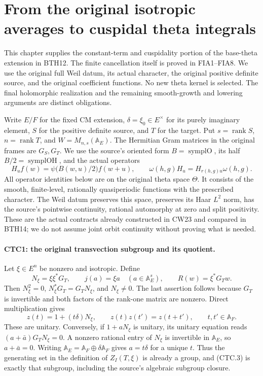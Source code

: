 \section{From the original isotropic averages to cuspidal theta integrals}
\label{sec:constant-terms-v33}

This chapter supplies the constant-term and cuspidality portion of
the base-theta extension in BTH12.  The finite cancellation itself is
proved in FIA1--FIA8.  We use the original full Weil datum, its actual
character, the original positive definite source, and the original
coefficient functions.  No new theta kernel is selected.  The final
holomorphic realization and the remaining smooth-growth and lowering
arguments are distinct obligations.

Write $E/F$ for the fixed CM extension, $\delta=\xi_0\in E^\times$
for its purely imaginary element, $S$ for the positive definite source,
and $T$ for the target.  Put $s=\operatorname{rank}S$,
$n=\operatorname{rank}T$, and
$W=M_{n,s}(\mathbb A_E)$.  The Hermitian Gram matrices in the original
frames are $G_S,G_T$.  We use the source's oriented form
$B=\operatorname{symplO}$, its half $B/2=\operatorname{symplOH}$,
and the actual operators
\[
 H_u f(w)=\psi\bigl(B(w,u)/2\bigr)f(w+u),\qquad
 \omega(h,g)H_u=H_{r(h,g)u}\omega(h,g).
 \tag{CTC.1}
\]
All operator identities below are on the original theta space
$\Theta$.  It consists of the smooth, finite-level, rationally
quasiperiodic functions with the prescribed character.  The Weil
datum preserves this space, preserves its Haar $L^2$ norm, has the
source's pointwise continuity, rational automorphy at zero and split
positivity.  These are the actual contracts already constructed in
CW23 and compared in BTH14; we do not assume joint orbit continuity
without proving what is needed.

\paragraph{CTC1: the original transvection subgroup and its quotient.}
\label{claim:CTC1}
Let $\xi\in E^n$ be nonzero and isotropic.  Define
\[
 N_\xi=\xi\xi^*G_T,\qquad
 j(a)=\xi a\quad(a\in\mathbb A_E^s),\qquad
 R(w)=\xi^*G_Tw.
 \tag{CTC.2}
\]
Then $N_\xi^2=0$, $N_\xi^*G_T=G_TN_\xi$, and
$N_\xi\ne0$.  The last assertion follows because $G_T$ is invertible
and both factors of the rank-one matrix are nonzero.  Direct
multiplication gives
\[
 z(t)=1+(t\delta)N_\xi,\qquad
 z(t)z(t')=z(t+t'),\qquad t,t'\in\mathbb A_F.
 \tag{CTC.3}
\]
These are unitary.  Conversely, if $1+aN_\xi$ is unitary, its unitary
equation reads $(a+\bar a)G_TN_\xi=0$.  A nonzero rational entry of
$N_\xi$ is invertible in $\mathbb A_E$, so $a+\bar a=0$.
Writing $\mathbb A_E=\mathbb A_F\oplus\delta\mathbb A_F$ gives
$a=t\delta$ for a unique $t$.  Thus the generating set in the
definition of $Z_I(T,\xi)$ is already a group, and (CTC.3) is exactly
that subgroup, including the source's algebraic subgroup closure.

